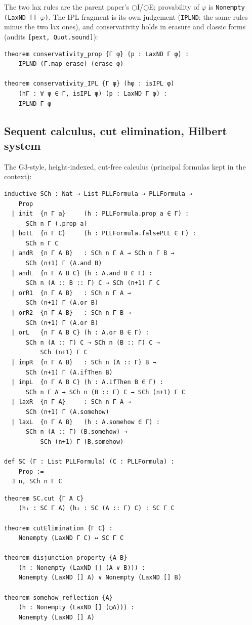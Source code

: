 \noindent The two lax rules are the parent paper's
\ensuremath{\bigcirc}I/\ensuremath{\bigcirc}E; provability of \ensuremath{\varphi} is
\texttt{Nonempty (LaxND [] \ensuremath{\varphi})}. The IPL fragment is its own
judgement (\texttt{IPLND}: the same rules minus the two lax ones), and
conservativity holds in erasure and classic forms (audits
\texttt{[pext, Quot.sound]}):

\begin{lstlisting}
theorem conservativity_prop {Γ φ} (p : LaxND Γ φ) :
    IPLND (Γ.map erase) (erase φ)

theorem conservativity_IPL {Γ φ} (hφ : isIPL φ)
    (hΓ : ∀ ψ ∈ Γ, isIPL ψ) (p : LaxND Γ φ) :
    IPLND Γ φ
\end{lstlisting}

\subsection{Sequent calculus, cut elimination, Hilbert system}

The G3-style, height-indexed, cut-free calculus (principal formulas
kept in the context):

\begin{lstlisting}
inductive SCh : Nat → List PLLFormula → PLLFormula →
    Prop
  | init  {n Γ a}     (h : PLLFormula.prop a ∈ Γ) :
      SCh n Γ (.prop a)
  | botL  {n Γ C}     (h : PLLFormula.falsePLL ∈ Γ) :
      SCh n Γ C
  | andR  {n Γ A B}   : SCh n Γ A → SCh n Γ B →
      SCh (n+1) Γ (A.and B)
  | andL  {n Γ A B C} (h : A.and B ∈ Γ) :
      SCh n (A :: B :: Γ) C → SCh (n+1) Γ C
  | orR1  {n Γ A B}   : SCh n Γ A →
      SCh (n+1) Γ (A.or B)
  | orR2  {n Γ A B}   : SCh n Γ B →
      SCh (n+1) Γ (A.or B)
  | orL   {n Γ A B C} (h : A.or B ∈ Γ) :
      SCh n (A :: Γ) C → SCh n (B :: Γ) C →
          SCh (n+1) Γ C
  | impR  {n Γ A B}   : SCh n (A :: Γ) B →
      SCh (n+1) Γ (A.ifThen B)
  | impL  {n Γ A B C} (h : A.ifThen B ∈ Γ) :
      SCh n Γ A → SCh n (B :: Γ) C → SCh (n+1) Γ C
  | laxR  {n Γ A}     : SCh n Γ A →
      SCh (n+1) Γ (A.somehow)
  | laxL  {n Γ A B}   (h : A.somehow ∈ Γ) :
      SCh n (A :: Γ) (B.somehow) →
          SCh (n+1) Γ (B.somehow)

def SC (Γ : List PLLFormula) (C : PLLFormula) :
    Prop :=
  ∃ n, SCh n Γ C
\end{lstlisting}

\begin{lstlisting}
theorem SC.cut {Γ A C}
    (h₁ : SC Γ A) (h₂ : SC (A :: Γ) C) : SC Γ C

theorem cutElimination {Γ C} :
    Nonempty (LaxND Γ C) ↔ SC Γ C

theorem disjunction_property {A B}
    (h : Nonempty (LaxND [] (A ∨ B))) :
    Nonempty (LaxND [] A) ∨ Nonempty (LaxND [] B)

theorem somehow_reflection {A}
    (h : Nonempty (LaxND [] (◯A))) :
    Nonempty (LaxND [] A)
\end{lstlisting}


